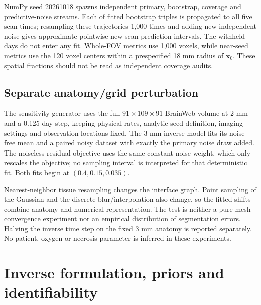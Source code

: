 NumPy seed 20261018 spawns independent primary, bootstrap, coverage and predictive-noise streams. Each of \BWBootstraps{} fitted bootstrap triples is propagated to all five scan times; resampling these trajectories 1,000 times and adding new independent noise gives approximate pointwise new-scan prediction intervals. The withheld days do not enter any fit. Whole-FOV metrics use 1,000 voxels, while near-seed metrics use the 120 voxel centers within a prespecified 18 mm radius of $\bm x_0$. These spatial fractions should not be read as independent coverage audits.

\subsection{Separate anatomy/grid perturbation}
The sensitivity generator uses the full $91\times109\times91$ BrainWeb volume at 2 mm and a 0.125-day step, keeping physical rates, analytic seed definition, imaging settings and observation locations fixed. The 3 mm inverse model fits its noise-free mean and a paired noisy dataset with exactly the primary noise draw added. The noiseless residual objective uses the same constant noise weight, which only rescales the objective; no sampling interval is interpreted for that deterministic fit. Both fits begin at $(0.4,0.15,0.035)$.

Nearest-neighbor tissue resampling changes the interface graph. Point sampling of the Gaussian and the discrete blur/interpolation also change, so the fitted shifts combine anatomy and numerical representation. The test is neither a pure mesh-convergence experiment nor an empirical distribution of segmentation errors. Halving the inverse time step on the fixed 3 mm anatomy is reported separately. No patient, oxygen or necrosis parameter is inferred in these experiments.

\section{Inverse formulation, priors and identifiability}\label{app:inference}
